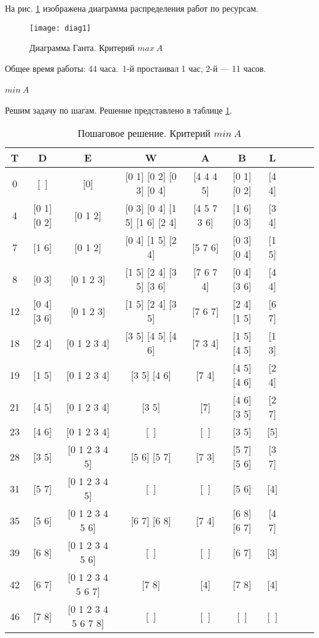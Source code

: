 На рис. \ref{pic:diag1} изображена диаграмма распределения работ по ресурсам.

\begin{figure}[H]
\begin{center}
	\texttt{[image: diag1]}
	\caption{Диаграмма Ганта. Критерий $max\ A$}
	\label{pic:diag1}
\end{center}
\end{figure}

Общее время работы: 44 часа.\  1-й простаивал 1 час, 2-й --- 11 часов.

\paragraph{$min\ A$} Решим задачу по шагам. Решение представлено в таблице \ref{tab:mina}.

\begin{table}[H]
\begin{center}
	\def\tabcolsep{2pt}
	\caption{Пошаговое решение. Критерий $min\ A$}
	\label{tab:mina}
	\begin{tabular}{|c|c|c|c|c|c|c|c|c|c|}
	\hline 
	T & D & E & W & A & B & L\\ \hline
0 & [~] & [0] & [0 1] [0 2] [0 3] [0 4] & [4 4 4 5] & [0 1] [0 2] & [4 4] \\ \hline
4 & [0 1] [0 2] & [0 1 2] & [0 3] [0 4] [1 5] [1 6] [2 4] & [4 5 7 3 6] & [1 6] [0 3] & [3 4] \\ \hline
7 & [1 6] & [0 1 2] & [0 4] [1 5] [2 4] & [5 7 6] & [0 3] [0 4] & [1 5] \\ \hline
8 & [0 3] & [0 1 2 3] & [1 5] [2 4] [3 5] [3 6] & [7 6 7 4] & [0 4] [3 6] & [4 4] \\ \hline
12 & [0 4] [3 6] & [0 1 2 3] & [1 5] [2 4] [3 5] & [7 6 7] & [2 4] [1 5] & [6 7] \\ \hline
18 & [2 4] & [0 1 2 3 4] & [3 5] [4 5] [4 6] & [7 3 4] & [1 5] [4 5] & [1 3] \\ \hline
19 & [1 5] & [0 1 2 3 4] & [3 5] [4 6] & [7 4] & [4 5] [4 6] & [2 4] \\ \hline
21 & [4 5] & [0 1 2 3 4] & [3 5] & [7] & [4 6] [3 5] & [2 7] \\ \hline
23 & [4 6] & [0 1 2 3 4] & [~] & [~] & [3 5] & [5] \\ \hline
28 & [3 5] & [0 1 2 3 4 5] & [5 6] [5 7] & [7 3] & [5 7] [5 6] & [3 7] \\ \hline
31 & [5 7] & [0 1 2 3 4 5] & [~] & [~] & [5 6] & [4] \\ \hline
35 & [5 6] & [0 1 2 3 4 5 6] & [6 7] [6 8] & [7 4] & [6 8] [6 7] & [4 7] \\ \hline
39 & [6 8] & [0 1 2 3 4 5 6] & [~] & [~] & [6 7] & [3] \\ \hline
42 & [6 7] & [0 1 2 3 4 5 6 7] & [7 8] & [4] & [7 8] & [4] \\ \hline
46 & [7 8] & [0 1 2 3 4 5 6 7 8] & [~] & [~] & [~] & [~] \\ \hline
	\end{tabular} 
\end{center}
\end{table}

